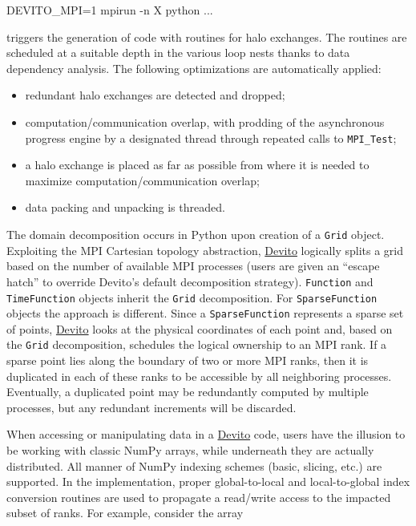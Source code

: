 \documentclass[conference]{IEEEtran}
\newenvironment{Shaded}{}{}
\newcommand{\DecValTok}[1]{\textcolor[rgb]{0.25,0.63,0.44}{{#1}}}
\newcommand{\NormalTok}[1]{{#1}}
\begin{document}
\begin{Shaded}
\begin{Highlighting}[]
\NormalTok{DEVITO_MPI=}\DecValTok{1} \NormalTok{mpirun -n X python ...}
\end{Highlighting}
\end{Shaded}

triggers the generation of code with routines for halo exchanges. The
routines are scheduled at a suitable depth in the various loop nests
thanks to data dependency analysis. The following optimizations are
automatically applied:

\begin{itemize}
\itemsep1pt\parskip0pt
\item
  redundant halo exchanges are detected and dropped;
\item
  computation/communication overlap, with prodding of the asynchronous
  progress engine by a designated thread through repeated calls to
  \texttt{MPI\_Test};
\item
  a halo exchange is placed as far as possible from where it is needed
  to maximize computation/communication overlap;
\item
  data packing and unpacking is threaded.
\end{itemize}

The domain decomposition occurs in Python upon creation of a
\texttt{Grid} object. Exploiting the MPI Cartesian topology abstraction,
\href{https://github.com/devitocodes/devito}{Devito} logically splits a
grid based on the number of available MPI processes (users are given an
``escape hatch'' to override Devito's default decomposition strategy).
\texttt{Function} and \texttt{TimeFunction} objects inherit the
\texttt{Grid} decomposition. For \texttt{SparseFunction} objects the
approach is different. Since a \texttt{SparseFunction} represents a
sparse set of points,
\href{https://github.com/devitocodes/devito}{Devito} looks at the
physical coordinates of each point and, based on the \texttt{Grid}
decomposition, schedules the logical ownership to an MPI rank. If a
sparse point lies along the boundary of two or more MPI ranks, then it
is duplicated in each of these ranks to be accessible by all neighboring
processes. Eventually, a duplicated point may be redundantly computed by
multiple processes, but any redundant increments will be discarded.

When accessing or manipulating data in a
\href{https://github.com/devitocodes/devito}{Devito} code, users have
the illusion to be working with classic NumPy arrays, while underneath
they are actually distributed. All manner of NumPy indexing schemes
(basic, slicing, etc.) are supported. In the implementation, proper
global-to-local and local-to-global index conversion routines are used
to propagate a read/write access to the impacted subset of ranks. For
example, consider the array
\end{document}
